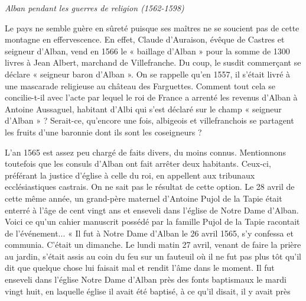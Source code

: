 

\begin{center}
    {\Large\itshape Alban pendant les guerres de religion (1562-1598)}
\end{center}

\vspace{1em}

Le pays ne semble guère en sûreté puisque ses maîtres ne se soucient pas de cette montagne en effervescence. En effet, Claude d'Auraison, évêque de Castres et seigneur d'Alban, vend en 1566 le « baillage d'Alban » pour la somme de 1300 livres à Jean Albert, marchand de Villefranche. Du coup, le susdit commerçant se déclare « seigneur baron d'Alban ». On se rappelle qu'en 1557, il s'était livré à une mascarade religieuse au château des Farguettes. Comment tout cela se concilie-t-il avec l'acte par lequel le roi de France a arrenté les revenus d'Alban à Antoine Aussaguel, habitant d'Albi qui s'est déclaré sur le champ « seigneur d'Alban » ? Serait-ce, qu'encore une fois, albigeois et villefranchois se partagent les fruits d'une baronnie dont ils sont les coseigneurs ?

\vspace{0.8em}

L'an 1565 est assez peu chargé de faits divers, du moins connus. Mentionnons toutefois que les consuls d'Alban ont fait arrêter deux habitants. Ceux-ci, préférant la justice d'église à celle du roi, en appellent aux tribunaux ecclésiastiques castrais. On ne sait pas le résultat de cette option. Le 28 avril de cette même année, un grand-père maternel d'Antoine Pujol de la Tapie était enterré à l'âge de cent vingt ans et enseveli dans l'église de Notre Dame d'Alban. Voici ce qu'un cahier manuscrit possédé par la famille Pujol de la Tapie racontait de l'événement... « Il fut à Notre Dame d'Alban le 26 avril 1565, s'y confessa et communia. C'était un dimanche. Le lundi matin 27 avril, venant de faire la prière au jardin, s'était assis au coin du feu sur un fauteuil où il ne fut pas plus tôt qu'il dit que quelque chose lui faisait mal et rendit l'âme dans le moment. Il fut enseveli dans l'église Notre Dame d'Alban près des fonts baptismaux le mardi vingt huit, en laquelle église il avait été baptisé, à ce qu'il disait, il y avait près
